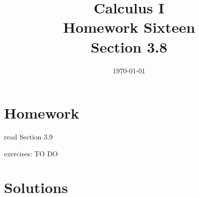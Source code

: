 \documentclass[letterpaper, landscape]{exam}
\title{Calculus I \\ Homework Sixteen \\ Section 3.8}
\author{}
\date{\today}
\begin{document}
  \maketitle

  \section{Homework}
    \begin{itemize*}
      \item read Section 3.9
      \item exercises: TO DO
    \end{itemize*}

  \ifprintanswers

  \section{Solutions}
\end{document}
